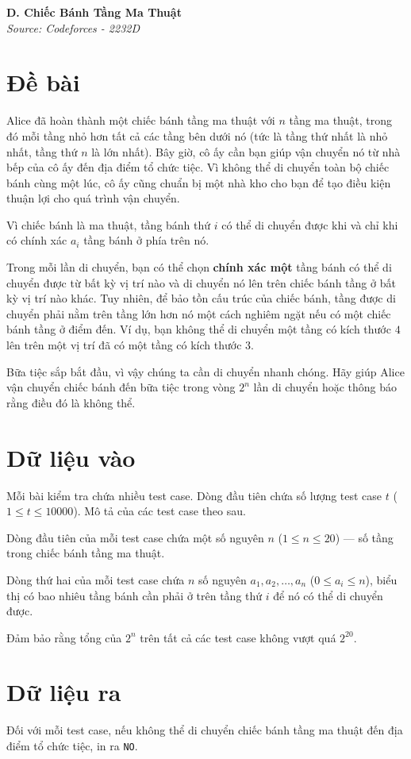 \documentclass[11pt]{article}
\newcommand{\problem}[2]{
    \begin{problembox}
    \begin{center}
        \Large \textbf{#1} \\
        \vspace{0.2cm}
        \small \textit{Source: #2}
    \end{center}
    \end{problembox}
}
\begin{document}
\newpage
\problem{D. Chiếc Bánh Tầng Ma Thuật}{Codeforces - 2232D}

\section*{Đề bài}
Alice đã hoàn thành một chiếc bánh tầng ma thuật với $n$ tầng ma thuật, trong đó mỗi tầng nhỏ hơn tất cả các tầng bên dưới nó (tức là tầng thứ nhất là nhỏ nhất, tầng thứ $n$ là lớn nhất). Bây giờ, cô ấy cần bạn giúp vận chuyển nó từ nhà bếp của cô ấy đến địa điểm tổ chức tiệc. Vì không thể di chuyển toàn bộ chiếc bánh cùng một lúc, cô ấy cũng chuẩn bị một nhà kho cho bạn để tạo điều kiện thuận lợi cho quá trình vận chuyển.

Vì chiếc bánh là ma thuật, tầng bánh thứ $i$ có thể di chuyển được khi và chỉ khi có chính xác $a_i$ tầng bánh ở phía trên nó.

Trong mỗi lần di chuyển, bạn có thể chọn \textbf{chính xác một} tầng bánh có thể di chuyển được từ bất kỳ vị trí nào và di chuyển nó lên trên chiếc bánh tầng ở bất kỳ vị trí nào khác. Tuy nhiên, để bảo tồn cấu trúc của chiếc bánh, tầng được di chuyển phải nằm trên tầng lớn hơn nó một cách nghiêm ngặt nếu có một chiếc bánh tầng ở điểm đến. Ví dụ, bạn không thể di chuyển một tầng có kích thước $4$ lên trên một vị trí đã có một tầng có kích thước $3$.

Bữa tiệc sắp bắt đầu, vì vậy chúng ta cần di chuyển nhanh chóng. Hãy giúp Alice vận chuyển chiếc bánh đến bữa tiệc trong vòng $2^n$ lần di chuyển hoặc thông báo rằng điều đó là không thể.

\section*{Dữ liệu vào}
Mỗi bài kiểm tra chứa nhiều test case. Dòng đầu tiên chứa số lượng test case $t$ ($1 \le t \le 10000$). Mô tả của các test case theo sau.

Dòng đầu tiên của mỗi test case chứa một số nguyên $n$ ($1 \le n \le 20$) — số tầng trong chiếc bánh tầng ma thuật.

Dòng thứ hai của mỗi test case chứa $n$ số nguyên $a_1, a_2, \ldots, a_n$ ($0 \le a_i \le n$), biểu thị có bao nhiêu tầng bánh cần phải ở trên tầng thứ $i$ để nó có thể di chuyển được.

Đảm bảo rằng tổng của $2^n$ trên tất cả các test case không vượt quá $2^{20}$.

\section*{Dữ liệu ra}
Đối với mỗi test case, nếu không thể di chuyển chiếc bánh tầng ma thuật đến địa điểm tổ chức tiệc, in ra \texttt{NO}.
\end{document}
